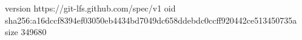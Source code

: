 version https://git-lfs.github.com/spec/v1
oid sha256:a16dccf8394ef03050eb4434bd7049dc658ddebdc0ccff920442ce513450735a
size 349680
